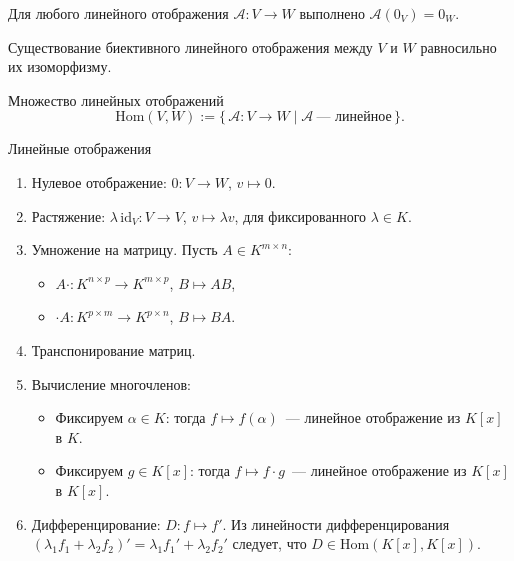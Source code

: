 \begin{remark}
	Для любого линейного отображения $\mathcal{A} \colon V \to W$ выполнено $\mathcal{A}(0_V) = 0_W$.
\end{remark}

\begin{remark}
	Существование биективного линейного отображения между $V$ и $W$ равносильно их изоморфизму.
\end{remark}

\begin{Definition}{Множество линейных отображений}{}
	\[
	\mathrm{Hom}(V, W) := \{\,\mathcal{A} \colon V \to W \mid \mathcal{A}\ \text{--- линейное}\,\}.
	\]
\end{Definition}

\begin{Example}{Линейные отображения}{}
	\begin{enumerate}\setlength{\itemsep}{6pt}
		\item Нулевое отображение: $0 \colon V \to W$, $v \mapsto 0$.
		\item Растяжение: $\lambda\,\mathrm{id}_V \colon V \to V$, $v \mapsto \lambda v$, для фиксированного $\lambda \in K$.
		\item Умножение на матрицу. Пусть $A \in K^{m \times n}$:
		\begin{itemize}
			\item $A\cdot \colon K^{n \times p} \to K^{m \times p}$, $B \mapsto AB$,
			\item $\cdot A \colon K^{p \times m} \to K^{p \times n}$, $B \mapsto BA$.
		\end{itemize}
		\item Транспонирование матриц.
		\item Вычисление многочленов:
		\begin{itemize}
			\item Фиксируем $\alpha \in K$: тогда $f \mapsto f(\alpha)$~--- линейное отображение из $K[x]$ в $K$.
			\item Фиксируем $g \in K[x]$: тогда $f \mapsto f \cdot g$~--- линейное отображение из $K[x]$ в $K[x]$.
		\end{itemize}
		\item Дифференцирование: $D \colon f \mapsto f'$. Из линейности дифференцирования
		$(\lambda_1 f_1 + \lambda_2 f_2)' = \lambda_1 f_1' + \lambda_2 f_2'$ следует, что $D \in \mathrm{Hom}(K[x], K[x])$.
	\end{enumerate}
\end{Example}

